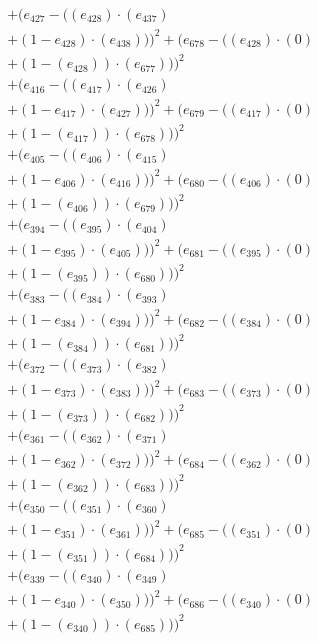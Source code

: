 \documentclass[10pt, a4paper]{article}
\begin{document}
\begin{align*}
& + (e_{427} - ((e_{428})  \cdot  (e_{437}) \\
& + (1 - e_{428})  \cdot  (e_{438})))^{2} + (e_{678} - ((e_{428}) \cdot (0) \\
& + (1 - (e_{428})) \cdot (e_{677})))^{2} \\
& + (e_{416} - ((e_{417})  \cdot  (e_{426}) \\
& + (1 - e_{417})  \cdot  (e_{427})))^{2} + (e_{679} - ((e_{417}) \cdot (0) \\
& + (1 - (e_{417})) \cdot (e_{678})))^{2} \\
& + (e_{405} - ((e_{406})  \cdot  (e_{415}) \\
& + (1 - e_{406})  \cdot  (e_{416})))^{2} + (e_{680} - ((e_{406}) \cdot (0) \\
& + (1 - (e_{406})) \cdot (e_{679})))^{2} \\
& + (e_{394} - ((e_{395})  \cdot  (e_{404}) \\
& + (1 - e_{395})  \cdot  (e_{405})))^{2} + (e_{681} - ((e_{395}) \cdot (0) \\
& + (1 - (e_{395})) \cdot (e_{680})))^{2} \\
& + (e_{383} - ((e_{384})  \cdot  (e_{393}) \\
& + (1 - e_{384})  \cdot  (e_{394})))^{2} + (e_{682} - ((e_{384}) \cdot (0) \\
& + (1 - (e_{384})) \cdot (e_{681})))^{2} \\
& + (e_{372} - ((e_{373})  \cdot  (e_{382}) \\
& + (1 - e_{373})  \cdot  (e_{383})))^{2} + (e_{683} - ((e_{373}) \cdot (0) \\
& + (1 - (e_{373})) \cdot (e_{682})))^{2} \\
& + (e_{361} - ((e_{362})  \cdot  (e_{371}) \\
& + (1 - e_{362})  \cdot  (e_{372})))^{2} + (e_{684} - ((e_{362}) \cdot (0) \\
& + (1 - (e_{362})) \cdot (e_{683})))^{2} \\
& + (e_{350} - ((e_{351})  \cdot  (e_{360}) \\
& + (1 - e_{351})  \cdot  (e_{361})))^{2} + (e_{685} - ((e_{351}) \cdot (0) \\
& + (1 - (e_{351})) \cdot (e_{684})))^{2} \\
& + (e_{339} - ((e_{340})  \cdot  (e_{349}) \\
& + (1 - e_{340})  \cdot  (e_{350})))^{2} + (e_{686} - ((e_{340}) \cdot (0) \\
& + (1 - (e_{340})) \cdot (e_{685})))^{2} \\

\end{align*}
\end{document}

